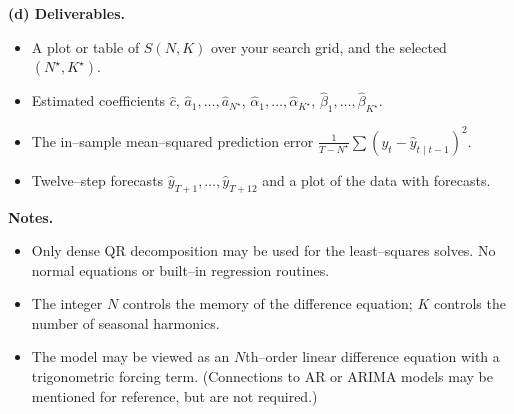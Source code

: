 \begin{problem}
\medskip
\textbf{(d) Deliverables.}
\begin{itemize}
  \item A plot or table of $S(N,K)$ over your search grid, and the selected
        $(N^\star,K^\star)$.
  \item Estimated coefficients
        $\hat c$, $\hat a_1,\dots,\hat a_{N^\star}$,
        $\hat\alpha_1,\dots,\hat\alpha_{K^\star}$,
        $\hat\beta_1,\dots,\hat\beta_{K^\star}$.
  \item The in--sample mean--squared prediction error
        $\frac{1}{T-N^\star}\sum (y_t-\widehat y_{t\mid t-1})^2$.
  \item Twelve--step forecasts
        $\widehat y_{T+1},\dots,\widehat y_{T+12}$ and a plot of the data with forecasts.
\end{itemize}

\medskip
\textbf{Notes.}
\begin{itemize}
  \item Only dense QR decomposition may be used for the least--squares solves.
        No normal equations or built--in regression routines.
  \item The integer $N$ controls the memory of the difference equation;
        $K$ controls the number of seasonal harmonics.
  \item The model may be viewed as an $N$th--order linear difference equation
        with a trigonometric forcing term.
        (Connections to AR or ARIMA models may be mentioned for reference,
        but are not required.)
\end{itemize}
\end{problem}
